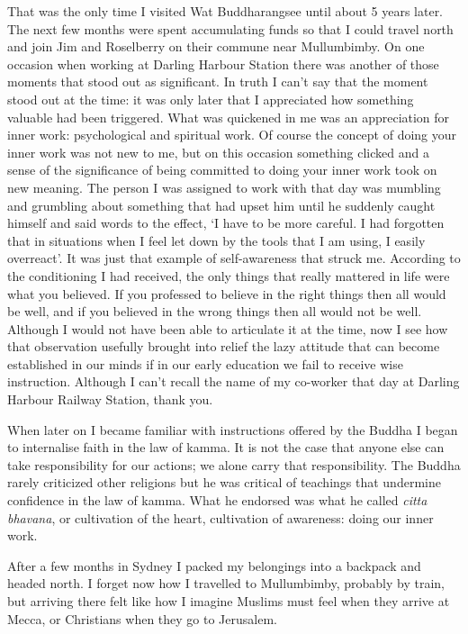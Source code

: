 That was the only time I visited Wat Buddharangsee until about 5 years
later. The next few months were spent accumulating funds so that I could
travel north and join Jim and Roselberry on their commune near
Mullumbimby. On one occasion when working at Darling Harbour Station
there was another of those moments that stood out as significant. In
truth I can't say that the moment stood out at the time: it was only
later that I appreciated how something valuable had been triggered. What
was quickened in me was an appreciation for inner work: psychological
and spiritual work. Of course the concept of doing your inner work was
not new to me, but on this occasion something clicked and a sense of the
significance of being committed to doing your inner work took on new
meaning. The person I was assigned to work with that day was mumbling
and grumbling about something that had upset him until he suddenly
caught himself and said words to the effect, `I have to be more careful.
I had forgotten that in situations when I feel let down by the tools
that I am using, I easily overreact'. It was just that example of
self-awareness that struck me. According to the conditioning I had
received, the only things that really mattered in life were what you
believed. If you professed to believe in the right things then all would
be well, and if you believed in the wrong things then all would not be
well. Although I would not have been able to articulate it at the time,
now I see how that observation usefully brought into relief the lazy
attitude that can become established in our minds if in our early
education we fail to receive wise instruction. Although I can't recall
the name of my co-worker that day at Darling Harbour Railway Station,
thank you.

When later on I became familiar with instructions offered by the Buddha
I began to internalise faith in the law of kamma. It is not the case
that anyone else can take responsibility for our actions; we alone carry
that responsibility. The Buddha rarely criticized other religions but he
was critical of teachings that undermine confidence in the law of kamma.
What he endorsed was what he called \emph{citta bhavana}, or cultivation
of the heart, cultivation of awareness: doing our inner work.

After a few months in Sydney I packed my belongings into a backpack and
headed north. I forget now how I travelled to Mullumbimby, probably by
train, but arriving there felt like how I imagine Muslims must feel when
they arrive at Mecca, or Christians when they go to Jerusalem.

